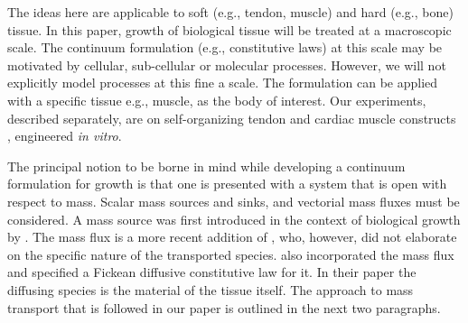The ideas here are applicable to soft (e.g., tendon, muscle) and
hard (e.g., bone) tissue. In this paper, growth of biological
tissue will be treated at a macroscopic scale. The continuum
formulation (e.g., constitutive laws) at this scale may be
motivated by cellular, sub-cellular or molecular processes.
However, we will not explicitly model processes at this fine a
scale. The formulation can be applied with a specific tissue e.g.,
muscle, as the body of interest. Our experiments, described
separately, are on self-organizing tendon \citep{Calve:04}
and cardiac muscle constructs \citep{Baaretal:2003}, engineered
{\it in vitro}.

The principal notion to be borne in mind while developing a
continuum formulation for growth is that one is presented with a
system that is open with respect to mass. Scalar mass sources and
sinks, and vectorial mass fluxes must be considered. A mass source
was first introduced in the context of biological growth by
\citet{CowinHegedus:76}. The mass flux is a more recent addition
of \citet{EpsteinMaugin:2000}, who, however, did not elaborate on
the specific nature of the transported species.
\citet{KuhlSteinmann:02} also incorporated the mass flux and
specified a Fickean diffusive constitutive law for it. In their
paper the diffusing species is the material of the tissue itself.
The approach to mass transport that is followed in our paper is
outlined in the next two paragraphs.

